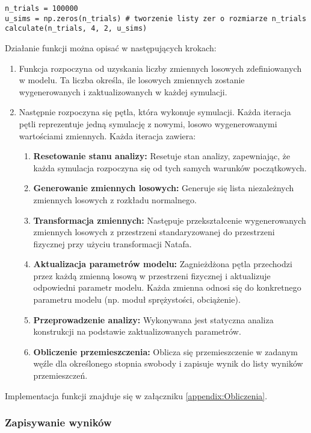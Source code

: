 \begin{lstlisting}
n_trials = 100000
u_sims = np.zeros(n_trials) # tworzenie listy zer o rozmiarze n_trials
calculate(n_trials, 4, 2, u_sims)
\end{lstlisting}
Działanie funkcji można opisać w następujących krokach:

\begin{enumerate}
    \item Funkcja rozpoczyna od uzyskania liczby zmiennych losowych zdefiniowanych w modelu. Ta liczba określa, ile losowych zmiennych zostanie wygenerowanych i zaktualizowanych w każdej symulacji.
    \item Następnie rozpoczyna się pętla, która wykonuje  symulacji. Każda iteracja pętli reprezentuje jedną symulację z nowymi, losowo wygenerowanymi wartościami zmiennych. Każda iteracja zawiera:
    \begin{enumerate}
        \item \textbf{Resetowanie stanu analizy:} Resetuje stan analizy, zapewniając, że każda symulacja rozpoczyna się od tych samych warunków początkowych.
        \item \textbf{Generowanie zmiennych losowych:} Generuje się lista niezależnych zmiennych losowych z rozkładu normalnego.
        \item \textbf{Transformacja zmiennych:} Następuje przekształcenie wygenerowanych zmiennych losowych z przestrzeni standaryzowanej do przestrzeni fizycznej przy użyciu transformacji Natafa.
        \item \textbf{Aktualizacja parametrów modelu:} Zagnieżdżona pętla przechodzi przez każdą zmienną losową w przestrzeni fizycznej i aktualizuje odpowiedni parametr modelu. Każda zmienna odnosi się do konkretnego parametru modelu (np. moduł sprężystości, obciążenie).
        \item \textbf{Przeprowadzenie analizy:} Wykonywana jest statyczna analiza konstrukcji na podstawie zaktualizowanych parametrów.
        \item \textbf{Obliczenie przemieszczenia:} Oblicza się przemieszczenie w zadanym węźle dla określonego stopnia swobody i zapisuje wynik do listy wyników przemieszczeń.
    \end{enumerate}
\end{enumerate}
Implementacja funkcji znajduje się w załączniku \ref{appendix:Obliczenia}.

\subsubsection*{Zapisywanie wyników}

